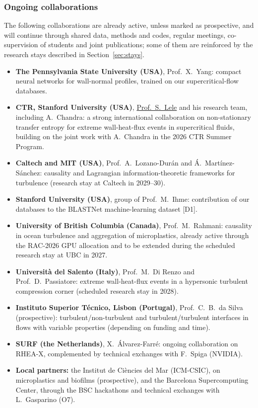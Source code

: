 \documentclass[11pt]{article}
\begin{document}
\subsubsection{Ongoing collaborations}
The following collaborations are already active, unless marked as prospective, and will continue through shared data, methods and codes, regular meetings, co-supervision of students and joint publications; some of them are reinforced by the research stays described in Section~\ref{sec:stays}.
\begin{itemize}
  \item \textbf{The Pennsylvania State University (USA)}, Prof.\ X.\ Yang: compact neural networks
  for wall-normal profiles, trained on our supercritical-flow databases.
  \item \textbf{CTR, Stanford University (USA)},
  \href{https://me.stanford.edu/people/sanjiva-lele}{Prof.\ S.\ Lele} and his research team, including   A.\ Chandra: a strong international collaboration on non-stationary transfer entropy for extreme wall-heat-flux events in supercritical fluids, building on the joint work with A.\ Chandra in the 2026 CTR Summer Program.
  \item \textbf{Caltech and MIT (USA)}, Prof.\ A.\ Lozano-Dur\'an and \'A.\ Mart\'inez-S\'anchez:   causality and Lagrangian information-theoretic frameworks for turbulence (research stay at Caltech in 2029--30).
  \item \textbf{Stanford University (USA)}, group of Prof.\ M.\ Ihme: contribution of our databases to the BLASTNet machine-learning dataset [D1].
  \item \textbf{University of British Columbia (Canada)}, Prof.\ M.\ Rahmani: causality in ocean turbulence and aggregation of microplastics, already active through the RAC-2026 GPU allocation and to be extended during the scheduled research stay at UBC in 2027.
  \item \textbf{Universit\`a del Salento (Italy)}, Prof.\ M.\ Di Renzo and Prof.\ D.\ Passiatore:
  extreme wall-heat-flux events in a hypersonic turbulent compression corner (scheduled research stay in 2028).
  \item \textbf{Instituto Superior T\'ecnico, Lisbon (Portugal)}, Prof.\ C.\ B.\ da Silva
  (prospective): turbulent/non-turbulent and turbulent/turbulent interfaces in flows with
  variable properties (depending on funding and time).
  \item \textbf{SURF (the Netherlands)}, X.\ \'Alvarez-Farr\'e: ongoing collaboration on RHEA-X,
  complemented by technical exchanges with F.\ Spiga (NVIDIA).
  \item \textbf{Local partners:} the Institut de Ci\`encies del Mar (ICM-CSIC), on microplastics and biofilms (prospective), and the Barcelona Supercomputing Center, through the BSC hackathons and technical exchanges with L.\ Gasparino (O7).
\end{itemize}
\end{document}
